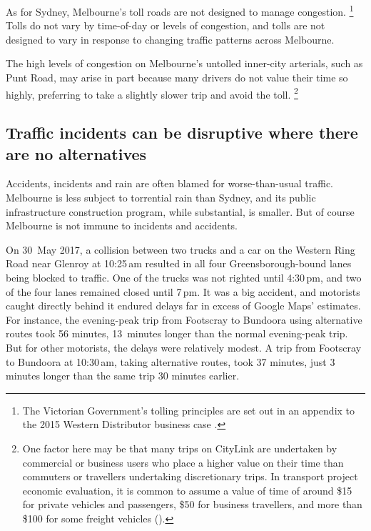 \documentclass{grattan}
\begin{document}
As for Sydney, Melbourne's toll roads are not designed to manage congestion.%
    \footnote{The Victorian Government's tolling principles are set out in an appendix to the 2015 Western Distributor business case
    \textcite[][Attachment~F]{Government2015WesternDistributor}.}
Tolls do not vary by time-of-day or levels of congestion, and tolls are not designed to vary in response to changing traffic patterns across Melbourne.



The high levels of congestion on Melbourne's untolled inner-city arterials, such as Punt Road, may arise in part because many drivers do not value their time so highly, preferring to take a slightly slower trip and avoid the toll.%
    \footnote{One factor here may be that many trips on CityLink are undertaken by commercial or business users who place a higher value on their time than commuters or travellers undertaking discretionary trips.
In transport project economic evaluation, it is common to assume a value of time of around \$15 for private vehicles and passengers, \$50 for business travellers, and more than \$100 for some freight vehicles (\textcite{ATAP-2017-Transport-Evaluation-Guidelines}).}

\subsection{Traffic incidents can be disruptive where there are no alternatives}

Accidents, incidents and rain are often blamed for worse-than-usual traffic. Melbourne is less subject to torrential rain than Sydney, and its public infrastructure construction program, while substantial, is smaller.
But of course Melbourne is not immune to incidents and accidents.

On 30~May 2017, a collision between two trucks and a car on the Western Ring Road near Glenroy at 10:25\,am resulted in all four Greensborough-bound lanes being blocked to traffic.
One of the trucks was not righted until 4:30\,pm, and two of the four lanes remained closed until 7\,pm.
It was a big accident, and motorists caught directly behind it endured delays far in excess of Google Maps' estimates. For instance, the evening-peak trip from Footscray to Bundoora using alternative routes took 56 minutes, 13~minutes longer than the normal evening-peak trip.
But for other motorists, the delays were relatively modest.
A trip from Footscray to Bundoora  at 10:30\,am, taking alternative routes, took 37 minutes, just 3 minutes longer than the same trip 30 minutes earlier.
\end{document}
